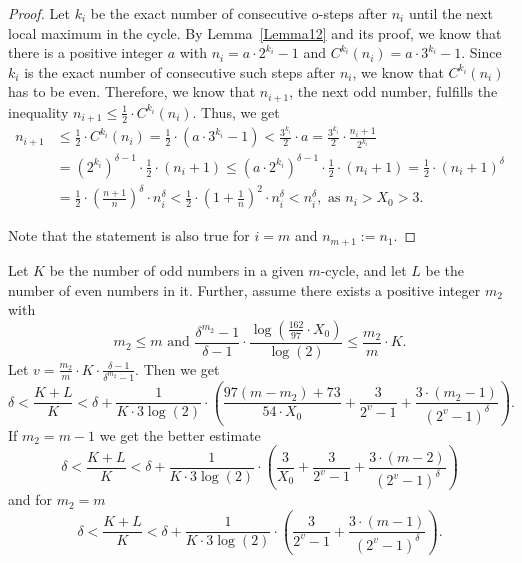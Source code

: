 \documentclass[12pt,reqno]{article}
\begin{document}
\begin{proof}
Let $k_i$ be the exact number of consecutive o-steps after $n_i$ until the next local maximum in the cycle. By Lemma~\ref{Lemma12} and its proof, we know that there is a positive integer $a$ with $n_i=a\cdot 2^{k_i}-1$ and $C^{k_i}(n_i)=a\cdot 3^{k_i}-1$. Since $k_i$ is the exact number of consecutive such steps after $n_i$, we know that $C^{k_i}(n_i)$ has to be even. Therefore, we know that $n_{i+1}$, the next odd number, fulfills the inequality $n_{i+1}\leq \frac{1}{2} \cdot C^{k_i}(n_i)$.  Thus, we get
\begin{align*}
n_{i+1}&\leq  \frac{1}{2} \cdot C^{k_i}(n_i) = \frac{1}{2} \cdot (a\cdot 3^{k_i}-1) < \frac{3^{k_i}}{2} \cdot a= \frac{3^{k_i}}{2} \cdot \frac{n_i+1}{2^{k_i}}\\
\quad &= \left(2^{k_i}\right)^{\delta-1} \cdot \frac{1}{2} \cdot (n_i+1) \leq \left(a \cdot 2^{k_i}\right)^{\delta-1} \cdot \frac{1}{2} \cdot (n_i+1) = \frac{1}{2} \cdot (n_i+1)^{\delta} \\
\quad &= \frac{1}{2} \cdot \left(\frac{n+1}{n}\right)^{\delta} \cdot n_i^{\delta}<\frac{1}{2} \cdot \left(1+\frac{1}{n}\right)^2 \cdot n_i^{\delta}<n_i^{\delta}, \text{ as $n_i>X_0>3$.}
\end{align*}

Note that the statement is also true for $i=m$ and $n_{m+1}:=n_1$.
\end{proof}

\begin{theorem}\label{Theorem15}
Let $K$ be the number of odd numbers in a given $m$-cycle, and let $L$ be the number of even numbers in it.  Further, assume there exists a positive integer $m_2$  with 
\[m_2\leq m \text{ and } \frac{\delta^{m_2}-1}{\delta-1} \cdot \frac{\log\left(\frac{162}{97} \cdot X_0\right)}{\log(2)} \leq \frac{m_2}{m} \cdot K.\]
Let $v=\tfrac{m_2}{m} \cdot K \cdot \tfrac{\delta-1}{\delta^{m_2}-1}$. Then we get 
\[\delta <\frac{K+L}{K}<\delta+\frac{1}{K \cdot 3 \log(2)} \cdot \left( \frac{97(m-m_2)+73}{54 \cdot X_0}+\frac{3}{2^v-1}+ \frac{3 \cdot (m_2-1)}{(2^v-1)^{\delta}} \right).\]
If $m_2=m-1$ we get the better estimate
\[\delta <\frac{K+L}{K}<\delta+\frac{1}{K \cdot 3 \log(2)} \cdot \left( \frac{3}{X_0}+\frac{3}{2^v-1}+ \frac{3 \cdot (m-2)}{(2^v-1)^{\delta}} \right)\]
and for $m_2=m$
\[\delta <\frac{K+L}{K}<\delta+\frac{1}{K \cdot 3 \log(2)} \cdot \left( \frac{3}{2^v-1}+ \frac{3 \cdot (m-1)}{(2^v-1)^{\delta}} \right).\]
\end{theorem}
\end{document}

